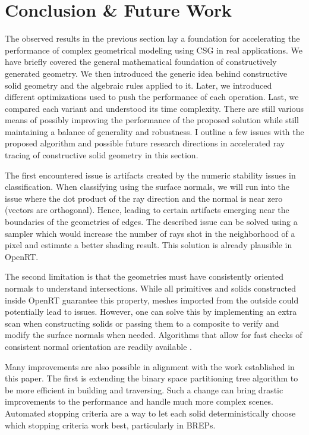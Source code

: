 \documentclass[a4paper,11pt,oneside]{article}
\begin{document}
\section{Conclusion \& Future Work}


The observed results in the previous section lay a foundation for accelerating the performance of complex geometrical modeling using CSG in real applications. We have briefly covered the general mathematical foundation of constructively generated geometry. We then introduced the generic idea behind constructive solid geometry and the algebraic rules applied to it. Later, we introduced different optimizations used to push the performance of each operation. Last, we compared each variant and understood its time complexity. There are still various means of possibly improving the performance of the proposed solution while still maintaining a balance of generality and robustness. I outline a few issues with the proposed algorithm and possible future research directions in accelerated ray tracing of constructive solid geometry in this section.

The first encountered issue is artifacts created by the numeric stability issues in classification. When classifying using the surface normals, we will run into the issue where the dot product of the ray direction and the normal is near zero (vectors are orthogonal). Hence, leading to certain artifacts emerging near the boundaries of the geometries of edges. The described issue can be solved using a sampler which would increase the number of rays shot in the neighborhood of a pixel and estimate a better shading result. This solution is already plausible in OpenRT.

The second limitation is that the geometries must have consistently oriented normals to understand intersections. While all primitives and solids constructed inside OpenRT guarantee this property, meshes imported from the outside could potentially lead to issues. However, one can solve this by implementing an extra scan when constructing solids or passing them to a composite to verify and modify the surface normals when needed. Algorithms that allow for fast checks of consistent normal orientation are readily available \cite{normal_orientation}.

Many improvements are also possible in alignment with the work established in this paper. The first is extending the binary space partitioning tree algorithm to be more efficient in building and traversing. Such a change can bring drastic improvements to the performance and handle much more complex scenes. Automated stopping criteria are a way to let each solid deterministically choose which stopping criteria work best, particularly in BREPs.
\end{document}
